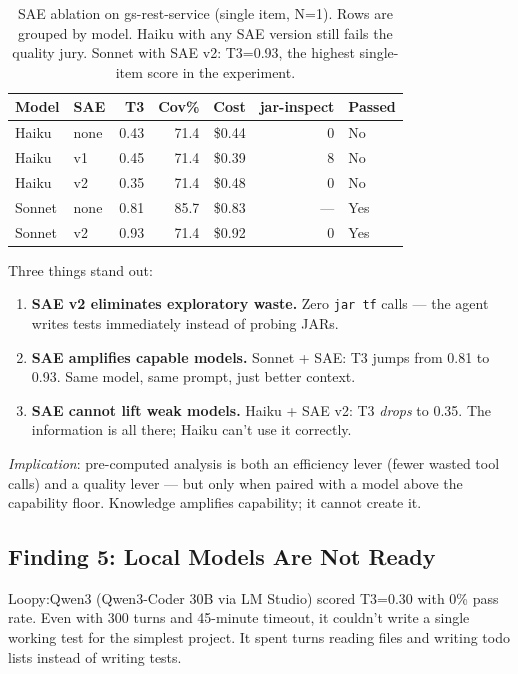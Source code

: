 \documentclass[11pt,a4paper]{article}
\begin{document}
\begin{table}[H]
\centering
\small
\begin{tabular}{@{}llrrrrl@{}}
\toprule
\textbf{Model} & \textbf{SAE} & \textbf{T3} & \textbf{Cov\%} & \textbf{Cost} & \textbf{jar-inspect} & \textbf{Passed} \\
\midrule
Haiku   & none    & 0.43 & 71.4 & \$0.44 & 0 & No \\
Haiku   & v1      & 0.45 & 71.4 & \$0.39 & 8 & No \\
Haiku   & v2      & 0.35 & 71.4 & \$0.48 & 0 & No \\
\addlinespace
Sonnet  & none    & 0.81 & 85.7 & \$0.83 & --- & Yes \\
Sonnet  & v2      & 0.93 & 71.4 & \$0.92 & 0 & Yes \\
\bottomrule
\end{tabular}
\caption{SAE ablation on gs-rest-service (single item, N=1).
Rows are grouped by model. Haiku with any SAE version still fails the quality jury.
Sonnet with SAE v2: T3=0.93, the highest single-item score in the experiment.}
\end{table}

Three things stand out:

\begin{enumerate}
  \item \textbf{SAE v2 eliminates exploratory waste.} Zero \texttt{jar tf}
        calls --- the agent writes tests immediately instead of probing JARs.
  \item \textbf{SAE amplifies capable models.} Sonnet + SAE: T3 jumps from
        0.81 to 0.93. Same model, same prompt, just better context.
  \item \textbf{SAE cannot lift weak models.} Haiku + SAE v2: T3 \emph{drops}
        to 0.35. The information is all there; Haiku can't use it correctly.
\end{enumerate}

\textit{Implication}: pre-computed analysis is both an efficiency lever
(fewer wasted tool calls) and a quality lever --- but only when paired with
a model above the capability floor. Knowledge amplifies capability;
it cannot create it.

\subsection{Finding 5: Local Models Are Not Ready}

Loopy:Qwen3 (Qwen3-Coder 30B via LM Studio) scored T3=0.30 with 0\% pass rate.
Even with 300 turns and 45-minute timeout, it couldn't write a single
working test for the simplest project. It spent turns reading files
and writing todo lists instead of writing tests.
\end{document}
